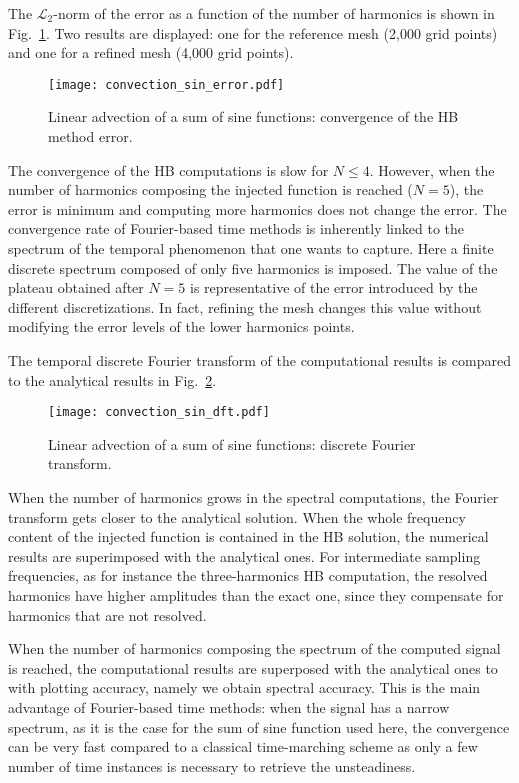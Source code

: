 The $\mathcal{L}_2$-norm of the error as a function of the number of harmonics
is shown in Fig.~\ref{fig:conv_sum_sine}. Two results are displayed:
one for the reference mesh (2,000 grid points) and one for
a refined mesh (4,000 grid points).
\begin{figure}[htb]
  \centering
  \texttt{[image: convection\_sin\_error.pdf]}
  \caption{Linear advection of a sum of sine functions: convergence of the HB method error.}
  \label{fig:conv_sum_sine}
\end{figure}
The convergence of the HB computations is slow  for
$N \leq 4$. However, when the number of harmonics composing
the injected function is reached ($N=5$), the error is minimum and computing
more harmonics does not change the error.
The convergence rate 
of Fourier-based time methods is inherently linked to the spectrum of the
temporal phenomenon that one wants to capture. Here a finite discrete spectrum composed of only five harmonics
is imposed.
The value of the plateau obtained 
after $N=5$ is representative of the error introduced by the different
discretizations. In fact, refining the mesh changes this value
without modifying the error levels of the lower harmonics points.

The temporal discrete Fourier transform
of the computational results is compared to the
analytical results in Fig.~\ref{fig:dft_sin}.
\begin{figure}[htb]
  \centering
  \texttt{[image: convection\_sin\_dft.pdf]}
  \caption{Linear advection of a sum of sine functions: 
  discrete Fourier transform.}
  \label{fig:dft_sin}
\end{figure}
When the number of harmonics grows in the spectral computations,
the Fourier transform gets closer to the analytical solution.
When the whole frequency content of the injected 
function is contained in the HB solution, 
the numerical results are superimposed with the analytical ones.
For intermediate sampling frequencies, as for 
instance the three-harmonics HB computation, 
the resolved harmonics have higher amplitudes 
than the exact one, since they compensate for harmonics that are not resolved.

When the number of harmonics composing the spectrum of the
computed signal is reached, the computational results are superposed
with the analytical ones to with plotting accuracy, namely we obtain spectral accuracy.
This is the main advantage of Fourier-based time methods: when the
signal has a narrow spectrum, as it is the case for the sum
of sine function used here, the
convergence can be very fast compared to a classical time-marching scheme
as only a few number of time instances is necessary to retrieve the
unsteadiness.

